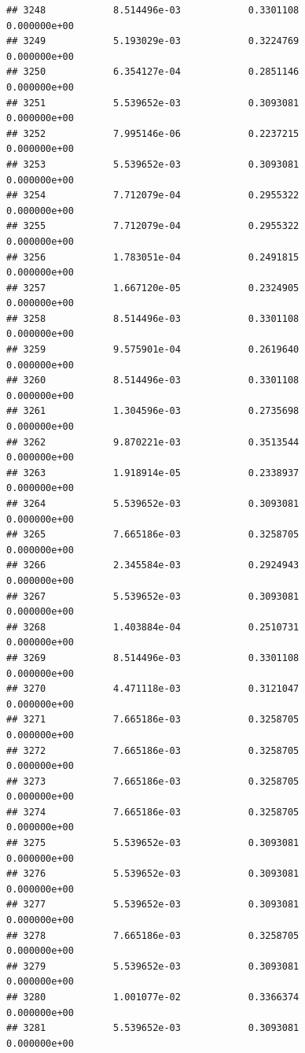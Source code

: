 \documentclass[
]{article}
\begin{document}
\begin{verbatim}
## 3248            8.514496e-03            0.3301108            0.000000e+00
## 3249            5.193029e-03            0.3224769            0.000000e+00
## 3250            6.354127e-04            0.2851146            0.000000e+00
## 3251            5.539652e-03            0.3093081            0.000000e+00
## 3252            7.995146e-06            0.2237215            0.000000e+00
## 3253            5.539652e-03            0.3093081            0.000000e+00
## 3254            7.712079e-04            0.2955322            0.000000e+00
## 3255            7.712079e-04            0.2955322            0.000000e+00
## 3256            1.783051e-04            0.2491815            0.000000e+00
## 3257            1.667120e-05            0.2324905            0.000000e+00
## 3258            8.514496e-03            0.3301108            0.000000e+00
## 3259            9.575901e-04            0.2619640            0.000000e+00
## 3260            8.514496e-03            0.3301108            0.000000e+00
## 3261            1.304596e-03            0.2735698            0.000000e+00
## 3262            9.870221e-03            0.3513544            0.000000e+00
## 3263            1.918914e-05            0.2338937            0.000000e+00
## 3264            5.539652e-03            0.3093081            0.000000e+00
## 3265            7.665186e-03            0.3258705            0.000000e+00
## 3266            2.345584e-03            0.2924943            0.000000e+00
## 3267            5.539652e-03            0.3093081            0.000000e+00
## 3268            1.403884e-04            0.2510731            0.000000e+00
## 3269            8.514496e-03            0.3301108            0.000000e+00
## 3270            4.471118e-03            0.3121047            0.000000e+00
## 3271            7.665186e-03            0.3258705            0.000000e+00
## 3272            7.665186e-03            0.3258705            0.000000e+00
## 3273            7.665186e-03            0.3258705            0.000000e+00
## 3274            7.665186e-03            0.3258705            0.000000e+00
## 3275            5.539652e-03            0.3093081            0.000000e+00
## 3276            5.539652e-03            0.3093081            0.000000e+00
## 3277            5.539652e-03            0.3093081            0.000000e+00
## 3278            7.665186e-03            0.3258705            0.000000e+00
## 3279            5.539652e-03            0.3093081            0.000000e+00
## 3280            1.001077e-02            0.3366374            0.000000e+00
## 3281            5.539652e-03            0.3093081            0.000000e+00

\end{verbatim}
\end{document}
